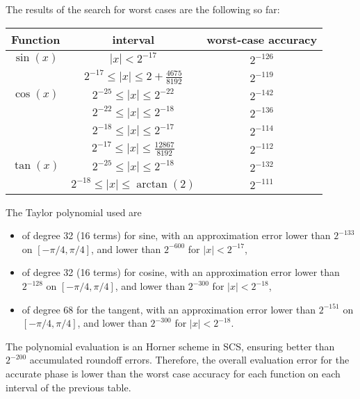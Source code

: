 The results of the search for worst cases are the following so far:

\begin{center}
  \begin{tabular}{|c|c|c|}
    \hline
    Function & interval & worst-case accuracy \\
    \hline
    \hline
       $\sin(x)$ &  $|x|< 2^{-17}$                            & $2^{-126}$      \\
                 &  $ 2^{-17} \le |x| \le 2+\frac{4675}{8192}$& $2^{-119}$     \\
    \hline
       $\cos(x)$ &  $2^{-25} \le |x| \le 2^{-22}$            & $2^{-142}$       \\
                 &  $2^{-22} \le |x| \le 2^{-18}$            & $2^{-136}$       \\
                 &  $2^{-18} \le |x| \le 2^{-17}$            & $2^{-114}$       \\
                 &  $2^{-17} \le |x| \le \frac{12867}{8192}$ & $2^{-112}$       \\
    \hline
       $\tan(x)$ &  $2^{-25} \le |x| \le 2^{-18}$            & $2^{-132}$       \\
                 &  $2^{-18} \le |x| \le \arctan(2)$         & $2^{-111}$       \\
    \hline
  \end{tabular}
\end{center}

The Taylor polynomial used are
\begin{itemize}
\item of degree 32 (16 terms) for sine, with an approximation error
  lower than $2^{-133}$ on $[-\pi/4, \pi/4]$, and lower than
  $2^{-600}$ for $|x|< 2^{-17}$,

\item of degree 32 (16 terms) for cosine, with an approximation error
  lower than $2^{-128}$ on $[-\pi/4, \pi/4]$, and lower than
  $2^{-300}$ for $|x|< 2^{-18}$,

\item of degree 68 for the tangent, with an approximation error lower
  than $2^{-151}$ on $[-\pi/4, \pi/4]$, and lower than
  $2^{-300}$ for $|x|< 2^{-18}$.
\end{itemize}


The polynomial evaluation is an Horner scheme in SCS, ensuring better
than $2^{-200}$ accumulated roundoff errors. Therefore, the overall
evaluation error for the accurate phase is lower than the worst case accuracy for
each function on each interval of the previous table.


